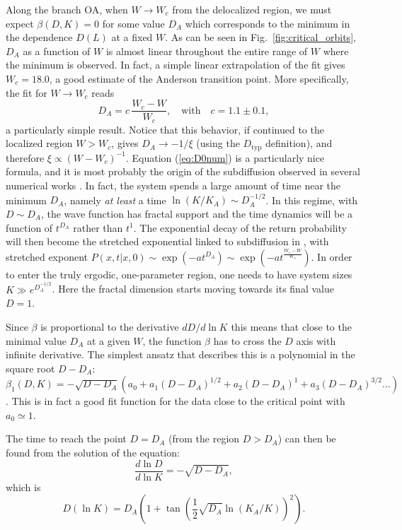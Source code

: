 \documentclass[reprint,aps,prl,superscriptaddress,english,nolongbibliography]{revtex4-2}
\begin{document}
{Along the branch OA, when $W\to W_c$ from the delocalized region, we must expect $\beta(D,K) = 0$ for some value $D_A$ which corresponds to the minimum in the dependence $D(L)$ at a fixed $W$.
As can be seen in Fig.~\ref{fig:critical_orbits}, $D_A$ as a function of $W$ is almost linear throughout the entire range of $W$ where the minimum is observed. In fact, a simple linear extrapolation of the fit gives $W_c=18.0$, a good estimate of the Anderson transition point. More specifically, the fit for $W\to W_c$ reads
\begin{equation}
    D_A=c \, \frac{W_c-W}{W_c}, \quad\mathrm{with}\quad c=1.1\pm 0.1,
    \label{eq:D0num}
\end{equation}
a particularly simple result. 
Notice that this behavior, if continued to the localized region $W>W_c$, gives $D_A\to -1/\xi$ (using the $D_{\mathrm{typ}}$ definition), and therefore $\xi\propto (W-W_c)^{-1}$.
Equation (\ref{eq:D0num}) is a particularly nice formula, and it is most probably the origin of the subdiffusion observed in several numerical works \cite{bera2018return,de2020subdiffusion}. In fact, the system spends a large amount of time near the minimum $D_A$, namely \emph{at least} a time $\ln(K/K_A)\sim D_A^{-1/2}$. In this regime, with $D\sim D_A$, the wave function has fractal support and the time dynamics will be a function of $t^{D_A}$ rather than $t^1$. The exponential decay of the return probability will then become the stretched exponential linked to subdiffusion in \cite{de2020subdiffusion}, with stretched exponent $P(x,t|x,0)\sim \exp\left(-a t^{D_A}\right)\sim \exp\left(-at^\frac{W_c-W}{W_c}\right)$. In order to enter the truly ergodic, one-parameter region, one needs to have system sizes $K\gg e^{D_A^{-1/2}}$. Here the fractal dimension starts moving towards its final value $D=1$.

Since $\beta$ is proportional to the derivative $dD/d\ln K$ this means that close to the minimal value $D_A$ at a given $W$, the function $\beta$ has to cross the $D$ axis with infinite derivative. The simplest ansatz that describes this is a polynomial in the square root $D-D_A$: $\beta_1(D,K)= -\sqrt{D-D_A}(a_0+a_1(D-D_A)^{1/2}+a_2(D-D_A)^{1}+a_3(D-D_A)^{3/2}...)$. This is in fact a good fit function for the data close to the critical point with $a_0\simeq 1$.

The time to reach the point $D=D_A$ (from the region $D>D_A$) can then be found from the solution of the equation:
\begin{equation}
    \frac{d\ln D}{d\ln K}=-\sqrt{D-D_A},
\end{equation}
which is 
\begin{equation}
    D(\ln K)=D_A\left(1+\tan\left(\frac{1}{2}\sqrt{D_A}\ln(K_A/K)\right)^2\right).
\label{eq:D_turn}
\end{equation}

}
\end{document}
